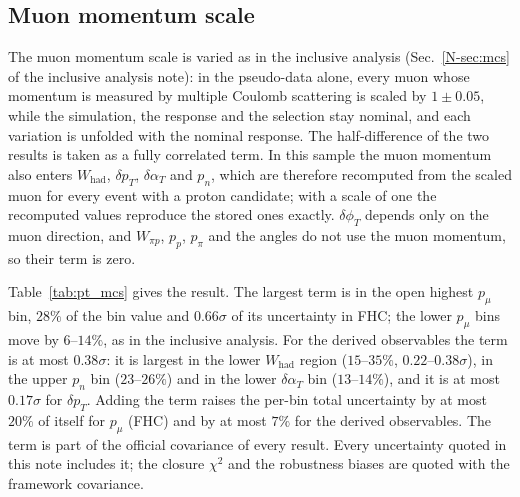 \documentclass[11pt,a4paper]{article}
\newcommand{\noteref}[2]{#1~\ref{N-#2} of the inclusive analysis note}
\begin{document}
\subsection{Muon momentum scale}
\label{sec:pt_mcs}

The muon momentum scale is varied as in the inclusive analysis (\noteref{Sec.}{sec:mcs}): in the pseudo-data alone, every muon whose momentum is measured by multiple Coulomb scattering is scaled by
$1\pm0.05$, while the simulation, the response and the selection stay nominal, and each variation is
unfolded with the nominal response. The half-difference of the two results is taken as a fully
correlated term. In this sample the muon momentum also enters $W_\mathrm{had}$, $\delta p_T$,
$\delta\alpha_T$ and $p_n$, which are therefore recomputed from the scaled muon for every event with a
proton candidate; with a scale of one the recomputed
values reproduce the stored ones exactly. $\delta\phi_T$ depends only on the muon direction, and
$W_{\pi p}$, $p_p$, $p_\pi$ and the angles do not use the muon momentum, so their term is zero.

Table~\ref{tab:pt_mcs} gives the result. The largest term is in the open highest $p_\mu$ bin,
$28\%$ of the bin value and $0.66\sigma$ of its uncertainty in FHC; the lower $p_\mu$ bins move by
$6$--$14\%$, as in the inclusive analysis. For the derived observables the term is at most
$0.38\sigma$: it is largest in the lower $W_\mathrm{had}$ region ($15$--$35\%$, $0.22$--$0.38\sigma$),
in the upper $p_n$ bin ($23$--$26\%$) and in the lower $\delta\alpha_T$ bin ($13$--$14\%$), and it is
at most $0.17\sigma$ for $\delta p_T$. Adding the term raises the per-bin total uncertainty by at
most $20\%$ of itself for $p_\mu$ (FHC) and by at most $7\%$ for the
derived observables. The term is part of the official covariance of every result. Every uncertainty quoted in this note
includes it; the closure $\chi^2$ and the robustness biases are quoted with the framework covariance.
\end{document}
